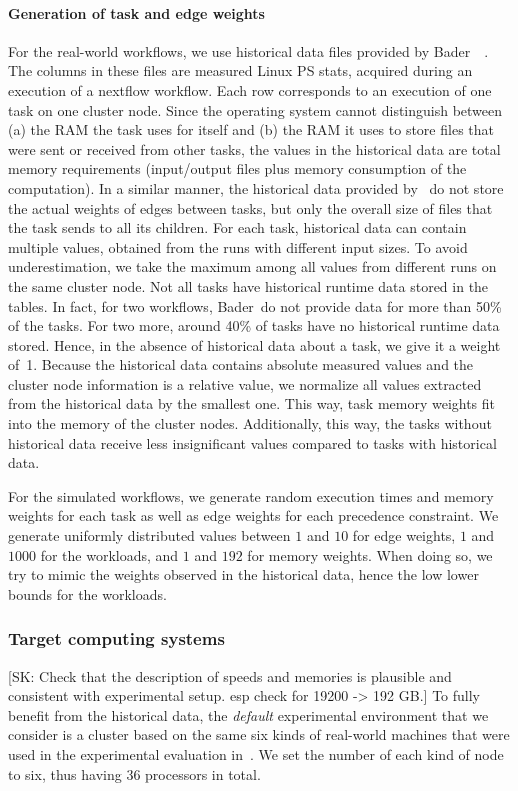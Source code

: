\documentclass[conference]{IEEEtran}
\newcommand{\skug}[1]{{\color{blue}[SK: #1]}}
\begin{document}
    \paragraph{Generation of task and edge weights}
    For the real-world workflows, we use historical data files provided by Bader~\etal~\cite{lotaru}.
    The columns in these files are measured Linux PS stats, acquired during an execution of a nextflow workflow.
    Each row corresponds to an execution of one task on one cluster node.
    Since the operating system cannot distinguish between (a) the RAM the task uses for itself and (b) the RAM it uses
    to store files that were sent or received from other tasks, the values in the historical data are total memory requirements (input/output files plus memory consumption of the computation).
    In a similar manner, the historical data provided by~\cite{lotaru} do not store the actual weights of edges between tasks, but only the overall
    size of files that the task sends to all its children.
    For each task, historical data can contain multiple values, obtained from the runs with different input sizes.
    To avoid underestimation, we take the maximum among all values from different runs on the same cluster node.
    Not all tasks have historical runtime data stored in the tables.
    In fact, for two workflows, Bader~\etal do not provide data for more than 50\% of the tasks.
    For two more, around 40\% of tasks have no historical runtime data stored.
    Hence, in the absence of historical data about a task, we give it a weight of~1.
%
    Because the historical data contains absolute measured values and the cluster node information is a relative value,
    we normalize all values extracted from the historical data by the smallest one.
    This way, task memory weights fit into the memory of the cluster nodes.
    Additionally, this way, the tasks without historical data receive less insignificant values compared to tasks with historical data.

    For the simulated workflows, we generate random execution times and memory weights for each task as well as
    edge weights for each precedence constraint.
    We generate uniformly distributed values between $1$ and $10$ for edge weights,
    $1$ and $1000$ for the workloads,
    and $1$ and $192$ for memory weights.
    When doing so, we try to mimic the weights observed in the historical data, hence \eg the low lower bounds for the
    workloads.


    \subsubsection{Target computing systems}
    \skug{Check that the description of speeds and memories is plausible and consistent with experimental setup. esp check for 19200 -> 192 GB.}
    To fully benefit from the historical data, the  {\em default} experimental environment
    that we consider is a cluster based on the same six
    kinds of real-world machines that were used in the experimental evaluation in~\cite{lotaru}.
    We set the number of each kind of node to six, thus having 36 processors in total. %
\end{document}
